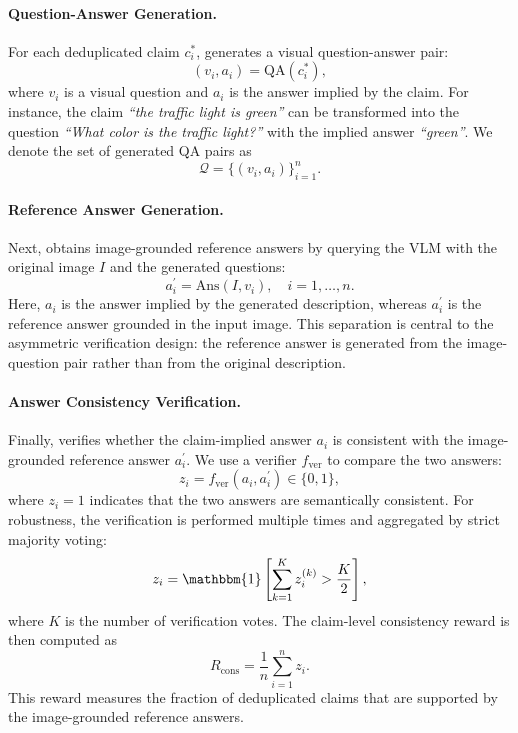 \paragraph{Question-Answer Generation.}
For each deduplicated claim $c_i^{\ast}$, \ours generates a visual
question-answer pair:
\begin{equation}
    (v_i,a_i)
    =
    \mathrm{QA}(c_i^{\ast}),
\end{equation}
where $v_i$ is a visual question and $a_i$ is the answer implied by the claim.
For instance, the claim \textit{``the traffic light is green''} can be
transformed into the question \textit{``What color is the traffic light?''} with
the implied answer \textit{``green''}. We denote the set of generated QA pairs as
\begin{equation}
    \mathcal{Q}
    =
    \{(v_i,a_i)\}_{i=1}^{n}.
\end{equation}

\paragraph{Reference Answer Generation.}
Next, \ours obtains image-grounded reference answers by querying the VLM with
the original image $I$ and the generated questions:
\begin{equation}
    a_i^{\prime}
    =
    \mathrm{Ans}(I,v_i),
    \quad i=1,\ldots,n.
\end{equation}
Here, $a_i$ is the answer implied by the generated description, whereas
$a_i^{\prime}$ is the reference answer grounded in the input image. This
separation is central to the asymmetric verification design: the reference
answer is generated from the image-question pair rather than from the original
description.

\paragraph{Answer Consistency Verification.}
Finally, \ours verifies whether the claim-implied answer $a_i$ is consistent
with the image-grounded reference answer $a_i^{\prime}$. We use a verifier
$f_{\mathrm{ver}}$ to compare the two answers:
\begin{equation}
    z_i
    =
    f_{\mathrm{ver}}(a_i,a_i^{\prime})
    \in
    \{0,1\},
\end{equation}
where $z_i=1$ indicates that the two answers are semantically consistent. For
robustness, the verification is performed multiple times and aggregated by
strict majority voting:
\begin{equation}
    z_i
    =
    \mathbbm{1}
    \left[
    \sum_{k=1}^{K} z_i^{(k)} > \frac{K}{2}
    \right],
\end{equation}
where $K$ is the number of verification votes. The claim-level consistency
reward is then computed as
\begin{equation}
    R_{\mathrm{cons}}
    =
    \frac{1}{n}
    \sum_{i=1}^{n}
    z_i.
\end{equation}
This reward measures the fraction of deduplicated claims that are supported by
the image-grounded reference answers.

